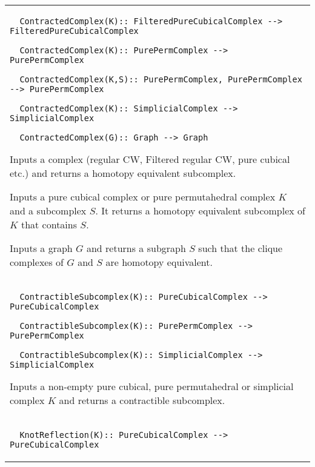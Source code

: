 \documentclass[a4paper,11pt]{report}
\begin{document}
{\begin{center}
\begin{tabular}{|l|}
\begin{verbatim}  ContractedComplex(K):: FilteredPureCubicalComplex --> FilteredPureCubicalComplex
\end{verbatim}
 
\begin{verbatim}  ContractedComplex(K):: PurePermComplex --> PurePermComplex
\end{verbatim}
 
\begin{verbatim}  ContractedComplex(K,S):: PurePermComplex, PurePermComplex --> PurePermComplex
\end{verbatim}
 
\begin{verbatim}  ContractedComplex(K):: SimplicialComplex --> SimplicialComplex
\end{verbatim}
 
\begin{verbatim}  ContractedComplex(G):: Graph --> Graph
\end{verbatim}
 

 Inputs a complex (regular CW, Filtered regular CW, pure cubical etc.) and
returns a homotopy equivalent subcomplex. 

 Inputs a pure cubical complex or pure permutahedral complex $K$ and a subcomplex $S$. It returns a homotopy equivalent subcomplex of $K$ that contains $S$. 

 Inputs a graph $G$ and returns a subgraph $S$ such that the clique complexes of $G$ and $S$ are homotopy equivalent. \\
 \index{ContractibleSubcomplex} 
\begin{verbatim}  ContractibleSubcomplex(K):: PureCubicalComplex --> PureCubicalComplex
\end{verbatim}
 
\begin{verbatim}  ContractibleSubcomplex(K):: PurePermComplex --> PurePermComplex
\end{verbatim}
 
\begin{verbatim}  ContractibleSubcomplex(K):: SimplicialComplex --> SimplicialComplex
\end{verbatim}


 

 Inputs a non-empty pure cubical, pure permutahedral or simplicial complex $K$ and returns a contractible subcomplex. \\
 \index{KnotReflection} 
\begin{verbatim}  KnotReflection(K):: PureCubicalComplex --> PureCubicalComplex
\end{verbatim}



\end{tabular}
\end{center}}
\end{document}
